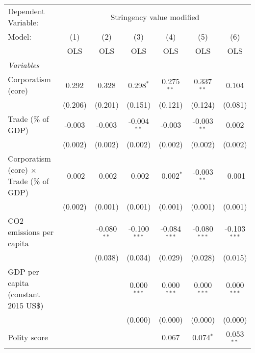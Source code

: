 
\begingroup
\centering
\begin{tabular}{lcccccc}
   \toprule
   Dependent Variable: & \multicolumn{6}{c}{Stringency value modified}\\
   Model:                                          & (1)     & (2)           & (3)            & (4)            & (5)            & (6)\\  
                                                   &  OLS    & OLS           & OLS            & OLS            & OLS            & OLS\\  
   \midrule
   \emph{Variables}\\
   Corporatism (core)                              & 0.292   & 0.328         & 0.298$^{*}$    & 0.275$^{**}$   & 0.337$^{**}$   & 0.104\\   
                                                   & (0.206) & (0.201)       & (0.151)        & (0.121)        & (0.124)        & (0.081)\\   
   Trade (\% of GDP)                               & -0.003  & -0.003        & -0.004$^{**}$  & -0.003         & -0.003$^{**}$  & 0.002\\   
                                                   & (0.002) & (0.002)       & (0.002)        & (0.002)        & (0.002)        & (0.002)\\   
   Corporatism (core) $\times$ Trade (\% of GDP)   & -0.002  & -0.002        & -0.002         & -0.002$^{*}$   & -0.003$^{**}$  & -0.001\\   
                                                   & (0.002) & (0.001)       & (0.001)        & (0.001)        & (0.001)        & (0.001)\\   
   CO2 emissions per capita                        &         & -0.080$^{**}$ & -0.100$^{***}$ & -0.084$^{***}$ & -0.080$^{***}$ & -0.103$^{***}$\\   
                                                   &         & (0.038)       & (0.034)        & (0.029)        & (0.028)        & (0.015)\\   
   GDP per capita (constant 2015 US\$)             &         &               & 0.000$^{***}$  & 0.000$^{***}$  & 0.000$^{***}$  & 0.000$^{***}$\\   
                                                   &         &               & (0.000)        & (0.000)        & (0.000)        & (0.000)\\   
   Polity score                                    &         &               &                & 0.067          & 0.074$^{*}$    & 0.053$^{**}$\\   

\end{tabular}
